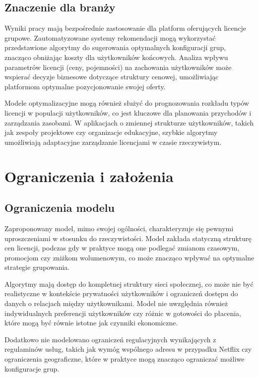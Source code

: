 \subsection{Znaczenie dla branży}

Wyniki pracy mają bezpośrednie zastosowanie dla platform oferujących licencje grupowe. Zautomatyzowane systemy rekomendacji mogą wykorzystać przedstawione algorytmy do sugerowania optymalnych konfiguracji grup, znacząco obniżając koszty dla użytkowników końcowych. Analiza wpływu parametrów licencji (ceny, pojemności) na zachowania użytkowników może wspierać decyzje biznesowe dotyczące struktury cenowej, umożliwiając platformom optymalne pozycjonowanie swojej oferty.

Modele optymalizacyjne mogą również służyć do prognozowania rozkładu typów licencji w populacji użytkowników, co jest kluczowe dla planowania przychodów i zarządzania zasobami. W aplikacjach o zmiennej strukturze użytkowników, takich jak zespoły projektowe czy organizacje edukacyjne, szybkie algorytmy umożliwiają adaptacyjne zarządzanie licencjami w czasie rzeczywistym.

\section{Ograniczenia i założenia}

\subsection{Ograniczenia modelu}

Zaproponowany model, mimo swojej ogólności, charakteryzuje się pewnymi uproszczeniami w stosunku do rzeczywistości. Model zakłada statyczną strukturę cen licencji, podczas gdy w praktyce mogą one podlegać zmianom czasowym, promocjom czy zniżkom wolumenowym, co może znacząco wpływać na optymalne strategie grupowania.

Algorytmy mają dostęp do kompletnej struktury sieci społecznej, co może nie być realistyczne w kontekście prywatności użytkowników i ograniczeń dostępu do danych o relacjach między użytkownikami. Model nie uwzględnia również indywidualnych preferencji użytkowników czy różnic w gotowości do płacenia, które mogą być równie istotne jak czynniki ekonomiczne.

Dodatkowo nie modelowano ograniczeń regulacyjnych wynikających z regulaminów usług, takich jak wymóg wspólnego adresu w przypadku Netflix czy ograniczenia geograficzne, które w praktyce mogą znacząco ograniczać możliwe konfiguracje grup.

